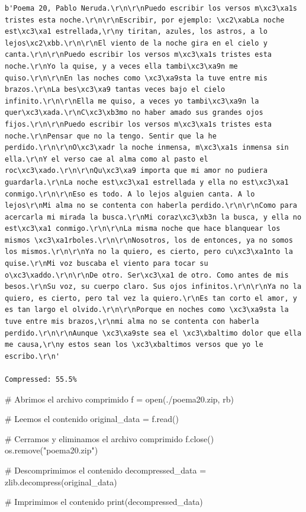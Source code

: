 \documentclass[
  spanish,
  letterpaper,
]{scrbook}
\newenvironment{Shaded}{\begin{snugshade}}{\end{snugshade}}
\newcommand{\BuiltInTok}[1]{\textcolor[rgb]{0.00,0.23,0.31}{#1}}
\newcommand{\CommentTok}[1]{\textcolor[rgb]{0.37,0.37,0.37}{#1}}
\newcommand{\NormalTok}[1]{\textcolor[rgb]{0.00,0.23,0.31}{#1}}
\newcommand{\OperatorTok}[1]{\textcolor[rgb]{0.37,0.37,0.37}{#1}}
\newcommand{\StringTok}[1]{\textcolor[rgb]{0.13,0.47,0.30}{#1}}
\theoremstyle{definition}
\theoremstyle{remark}
\begin{document}
\begin{verbatim}
b'Poema 20, Pablo Neruda.\r\n\r\nPuedo escribir los versos m\xc3\xa1s tristes esta noche.\r\n\r\nEscribir, por ejemplo: \xc2\xabLa noche est\xc3\xa1 estrellada,\r\ny tiritan, azules, los astros, a lo lejos\xc2\xbb.\r\n\r\nEl viento de la noche gira en el cielo y canta.\r\n\r\nPuedo escribir los versos m\xc3\xa1s tristes esta noche.\r\nYo la quise, y a veces ella tambi\xc3\xa9n me quiso.\r\n\r\nEn las noches como \xc3\xa9sta la tuve entre mis brazos.\r\nLa bes\xc3\xa9 tantas veces bajo el cielo infinito.\r\n\r\nElla me quiso, a veces yo tambi\xc3\xa9n la quer\xc3\xada.\r\nC\xc3\xb3mo no haber amado sus grandes ojos fijos.\r\n\r\nPuedo escribir los versos m\xc3\xa1s tristes esta noche.\r\nPensar que no la tengo. Sentir que la he perdido.\r\n\r\nO\xc3\xadr la noche inmensa, m\xc3\xa1s inmensa sin ella.\r\nY el verso cae al alma como al pasto el roc\xc3\xado.\r\n\r\nQu\xc3\xa9 importa que mi amor no pudiera guardarla.\r\nLa noche est\xc3\xa1 estrellada y ella no est\xc3\xa1 conmigo.\r\n\r\nEso es todo. A lo lejos alguien canta. A lo lejos\r\nMi alma no se contenta con haberla perdido.\r\n\r\nComo para acercarla mi mirada la busca.\r\nMi coraz\xc3\xb3n la busca, y ella no est\xc3\xa1 conmigo.\r\n\r\nLa misma noche que hace blanquear los mismos \xc3\xa1rboles.\r\n\r\nNosotros, los de entonces, ya no somos los mismos.\r\n\r\nYa no la quiero, es cierto, pero cu\xc3\xa1nto la quise.\r\nMi voz buscaba el viento para tocar su o\xc3\xaddo.\r\n\r\nDe otro. Ser\xc3\xa1 de otro. Como antes de mis besos.\r\nSu voz, su cuerpo claro. Sus ojos infinitos.\r\n\r\nYa no la quiero, es cierto, pero tal vez la quiero.\r\nEs tan corto el amor, y es tan largo el olvido.\r\n\r\nPorque en noches como \xc3\xa9sta la tuve entre mis brazos,\r\nmi alma no se contenta con haberla perdido.\r\n\r\nAunque \xc3\xa9ste sea el \xc3\xbaltimo dolor que ella me causa,\r\ny estos sean los \xc3\xbaltimos versos que yo le escribo.\r\n'

Compressed: 55.5%
\end{verbatim}

\begin{Shaded}
\begin{Highlighting}[]
\CommentTok{\# Abrimos el archivo comprimido}
\NormalTok{f }\OperatorTok{=} \BuiltInTok{open}\NormalTok{(}\StringTok{\textquotesingle{}./poema20.zip\textquotesingle{}}\NormalTok{, }\StringTok{\textquotesingle{}rb\textquotesingle{}}\NormalTok{)}

\CommentTok{\# Leemos el contenido}
\NormalTok{original\_data }\OperatorTok{=}\NormalTok{ f.read()}

\CommentTok{\# Cerramos y eliminamos el archivo comprimido}
\NormalTok{f.close()}
\NormalTok{os.remove(}\StringTok{"poema20.zip"}\NormalTok{)}

\CommentTok{\# Descomprimimos el contenido}
\NormalTok{decompressed\_data }\OperatorTok{=}\NormalTok{ zlib.decompress(original\_data)}

\CommentTok{\# Imprimimos el contenido}
\BuiltInTok{print}\NormalTok{(decompressed\_data)}
\end{Highlighting}
\end{Shaded}
\end{document}
